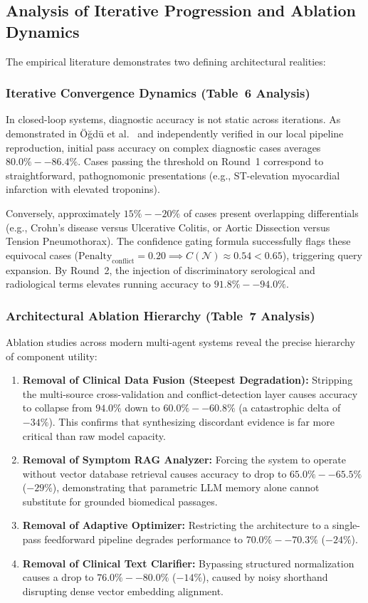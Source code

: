\documentclass[conference]{IEEEtran}
\begin{document}
\subsection{Analysis of Iterative Progression and Ablation Dynamics}
The empirical literature demonstrates two defining architectural realities:

\subsubsection{Iterative Convergence Dynamics (Table~6 Analysis)}
In closed-loop systems, diagnostic accuracy is not static across iterations. As demonstrated in Öğdü et al.~\cite{ogdu2025adaptive} and independently verified in our local pipeline reproduction, initial pass accuracy on complex diagnostic cases averages $80.0\%--86.4\%$. Cases passing the threshold on Round~1 correspond to straightforward, pathognomonic presentations (e.g., ST-elevation myocardial infarction with elevated troponins). 

Conversely, approximately $15\%--20\%$ of cases present overlapping differentials (e.g., Crohn's disease versus Ulcerative Colitis, or Aortic Dissection versus Tension Pneumothorax). The confidence gating formula successfully flags these equivocal cases ($\text{Penalty}_{\text{conflict}} = 0.20 \implies C(\mathcal{N}) \approx 0.54 < 0.65$), triggering query expansion. By Round~2, the injection of discriminatory serological and radiological terms elevates running accuracy to $91.8\%--94.0\%$.

\subsubsection{Architectural Ablation Hierarchy (Table~7 Analysis)}
Ablation studies across modern multi-agent systems reveal the precise hierarchy of component utility:
\begin{enumerate}
    \item \textbf{Removal of Clinical Data Fusion (Steepest Degradation):} Stripping the multi-source cross-validation and conflict-detection layer causes accuracy to collapse from $94.0\%$ down to $60.0\%--60.8\%$ (a catastrophic delta of $-34\%$). This confirms that synthesizing discordant evidence is far more critical than raw model capacity.
    \item \textbf{Removal of Symptom RAG Analyzer:} Forcing the system to operate without vector database retrieval causes accuracy to drop to $65.0\%--65.5\%$ ($-29\%$), demonstrating that parametric LLM memory alone cannot substitute for grounded biomedical passages.
    \item \textbf{Removal of Adaptive Optimizer:} Restricting the architecture to a single-pass feedforward pipeline degrades performance to $70.0\%--70.3\%$ ($-24\%$).
    \item \textbf{Removal of Clinical Text Clarifier:} Bypassing structured normalization causes a drop to $76.0\%--80.0\%$ ($-14\%$), caused by noisy shorthand disrupting dense vector embedding alignment.
\end{enumerate}
\end{document}
